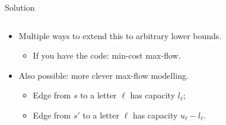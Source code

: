 \begin{frame}
    \frametitle{\problemtitle}

    \begin{block}{Solution}
        \vspace{1em}
        \begin{columns}
            \begin{column}[T]{0.4\textwidth}
                \begin{itemize}
                    \item<1-> Multiple ways to extend this to arbitrary lower bounds.
                    \begin{itemize}
                        \item<2-> If you have the code: min-cost max-flow.
                    \end{itemize}
                    \item<3-> Also possible: more clever max-flow modelling.
                    \begin{itemize}
                        \item Edge from $s$ to a letter $\ell$ has capacity $l_\ell$;
                        \item Edge from  $s'$ to a letter $\ell$ has capacity $u_\ell - l_{\ell}$.
                    \end{itemize}
                \end{itemize}
            \end{column}

            \hfill


\end{columns}
\end{block}
\end{frame}
